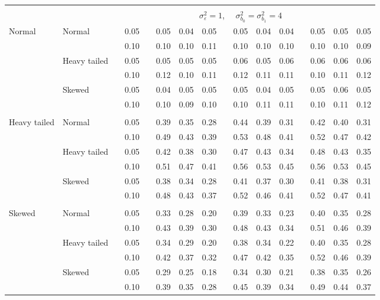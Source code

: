\documentclass{article} %
\begin{document}
\begin{table}[ht]
\begin{scriptsize}
\begin{center}
\begin{tabular}{ll p{.1cm} c p{.1cm} rrr p{.1cm} rrr p{.1cm} rrr}
&&&&&&&&&&&&&&&\\
& && && \multicolumn{9}{c}{$\sigma_{\varepsilon}^2 = 1$, \ \ $\sigma_{b_0}^2 = \sigma_{b_1}^2 = 4$} \\ \cline{6-16}
\rowcolor{gray!20}Normal       & Normal       && 0.05 &&   0.05 & 0.04 & 0.05 && 0.05 & 0.04 & 0.04 && 0.05 & 0.05 & 0.05 \\ 
\rowcolor{gray!20}             &              && 0.10 &&   0.10 & 0.10 & 0.11 && 0.10 & 0.10 & 0.10 && 0.10 & 0.10 & 0.09 \\ 
\rowcolor{gray!20}             & Heavy tailed && 0.05 &&   0.05 & 0.05 & 0.05 && 0.06 & 0.05 & 0.06 && 0.06 & 0.06 & 0.06 \\ 
\rowcolor{gray!20}             &              && 0.10 &&   0.12 & 0.10 & 0.11 && 0.12 & 0.11 & 0.11 && 0.10 & 0.11 & 0.12 \\ 
\rowcolor{gray!20}             & Skewed       && 0.05 &&   0.04 & 0.05 & 0.05 && 0.05 & 0.04 & 0.05 && 0.05 & 0.06 & 0.05 \\ 
\rowcolor{gray!20}             &              && 0.10 &&   0.10 & 0.09 & 0.10 && 0.10 & 0.11 & 0.11 && 0.10 & 0.11 & 0.12 \\ 
             &&&&&&&&&&&&&&&\\
Heavy tailed & Normal       && 0.05 &&   0.39 & 0.35 & 0.28 && 0.44 & 0.39 & 0.31 && 0.42 & 0.40 & 0.31 \\ 
             &              && 0.10 &&   0.49 & 0.43 & 0.39 && 0.53 & 0.48 & 0.41 && 0.52 & 0.47 & 0.42 \\ 
             & Heavy tailed && 0.05 &&   0.42 & 0.38 & 0.30 && 0.47 & 0.43 & 0.34 && 0.48 & 0.43 & 0.35 \\ 
             &              && 0.10 &&   0.51 & 0.47 & 0.41 && 0.56 & 0.53 & 0.45 && 0.56 & 0.53 & 0.45 \\ 
             & Skewed       && 0.05 &&   0.38 & 0.34 & 0.28 && 0.41 & 0.37 & 0.30 && 0.41 & 0.38 & 0.31 \\ 
             &              && 0.10 &&   0.48 & 0.43 & 0.37 && 0.52 & 0.46 & 0.41 && 0.52 & 0.47 & 0.41 \\ 
             &&&&&&&&&&&&&&&\\
Skewed       & Normal       && 0.05 &&   0.33 & 0.28 & 0.20 && 0.39 & 0.33 & 0.23 && 0.40 & 0.35 & 0.28 \\  
             &              && 0.10 &&   0.43 & 0.39 & 0.30 && 0.48 & 0.43 & 0.34 && 0.51 & 0.46 & 0.39 \\  
             & Heavy tailed && 0.05 &&   0.34 & 0.29 & 0.20 && 0.38 & 0.34 & 0.22 && 0.40 & 0.35 & 0.28 \\  
             &              && 0.10 &&   0.42 & 0.37 & 0.32 && 0.47 & 0.42 & 0.35 && 0.52 & 0.46 & 0.39 \\  
             & Skewed       && 0.05 &&   0.29 & 0.25 & 0.18 && 0.34 & 0.30 & 0.21 && 0.38 & 0.35 & 0.26 \\  
             &              && 0.10 &&   0.39 & 0.35 & 0.28 && 0.45 & 0.39 & 0.34 && 0.49 & 0.44 & 0.37 \\  



\end{tabular}
\end{center}
\end{scriptsize}
\end{table}
\end{document}
